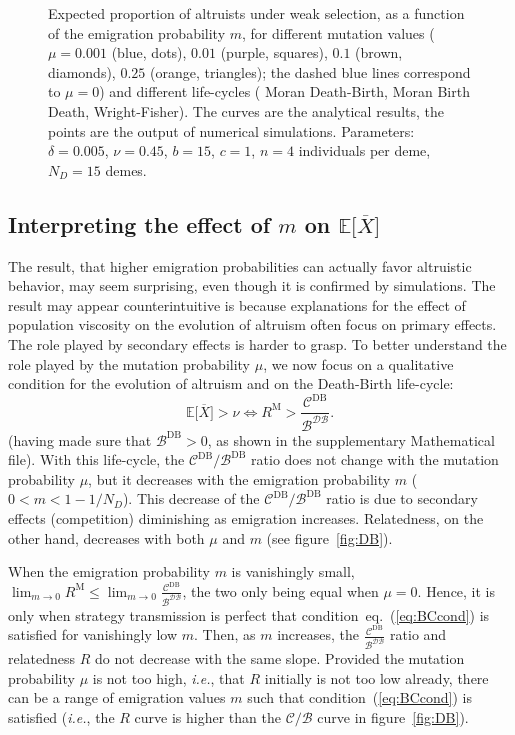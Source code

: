 \documentclass[11pt, letterpaper]{article}
\renewcommand{\eqref}[1]{\textup{{\normalfont eq.~(\ref{#1}}\normalfont)}}
\newcommand{\eqrefnoeq}[1]{(\ref{#1})}
\newcommand{\ie}{\textit{i.e.}}
\newcommand{\Esp}[1]{\mathbb{E}\big[ #1\big]}%
\newcommand{\Moran}{\textrm{M}}
\newcommand{\DB}{\textrm{DB}}
\newcommand{\mutbias}{\nu}
\newcommand{\ndemes}{N_D}
\newcommand{\selstr}{\delta}
\begin{document}
\begin{figure}
\begin{tabular}{ccc}
\end{tabular}
\caption{Expected proportion of altruists under weak selection, as a function of the emigration probability $m$, for different mutation values ($\mu = 0.001$ (blue, dots), $0.01$ (purple, squares), $0.1$ (brown, diamonds), $0.25$ (orange, triangles); the dashed blue lines correspond to $\mu=0$) and different life-cycles ( Moran Death-Birth,  Moran Birth Death,  Wright-Fisher). The curves are the analytical results, the points are the output of numerical simulations. 
Parameters: $\selstr = 0.005$, $\mutbias=0.45$, $b = 15$, $c = 1$, $n=4$ individuals per deme, $\ndemes=15$ demes.}
\label{fig:EX}
\end{figure}

\subsection{Interpreting the effect of $m$ on $\Esp{\overline{X}}$}

The result, that higher emigration probabilities can actually favor altruistic behavior, may seem surprising, even though it is confirmed by simulations. The result may appear counterintuitive is because explanations for the effect of population viscosity on the evolution of altruism often focus on primary effects. The role played by secondary effects is harder to grasp. To better understand the role played by the mutation probability $\mu$, we now focus on a qualitative condition for the evolution of altruism and on the Death-Birth life-cycle:
%
\begin{equation}\label{eq:BCcond}
\Esp{\overline{X}} > \nu \Leftrightarrow R^{\Moran} > \frac{\mathcal{C}^{\DB}}{\mathcal{B^{\DB}}}.
\end{equation}
%
(having made sure that $\mathcal{B}^{\DB}>0$, as shown in the supplementary Mathematical file). 
With this life-cycle, the $\mathcal{C}^{\DB}/\mathcal{B}^{\DB}$ ratio does not change with the mutation probability $\mu$, but it decreases with the emigration probability $m$ ($0<m<1-1/\ndemes$). This decrease of the $\mathcal{C}^{\DB}/\mathcal{B}^{\DB}$ ratio is due to secondary effects (competition) diminishing as emigration increases. Relatedness, on the other hand, decreases with both $\mu$ and $m$ (see figure~\ref{fig:DB}). 

When the emigration probability $m$ is vanishingly small, $\lim_{m\to 0} R^{\Moran} \leq \lim_{m\to 0} \frac{\mathcal{C}^{\DB}}{\mathcal{B^{\DB}}}$, the two only being equal when $\mu=0$.
Hence, it is only when strategy transmission is perfect that condition~\eqref{eq:BCcond} is satisfied for vanishingly low $m$. Then, as $m$ increases, the $\frac{\mathcal{C}^{\DB}}{\mathcal{B^{\DB}}}$ ratio and relatedness $R$ do not decrease with the same slope. Provided the mutation probability $\mu$ is not too high, \ie, that $R$ initially is not too low already, there can be a range of emigration values $m$ such that condition~\eqrefnoeq{eq:BCcond} is satisfied (\ie, the $R$ curve is higher than the $\mathcal{C}/\mathcal{B}$ curve in figure~\ref{fig:DB}).
\end{document}
